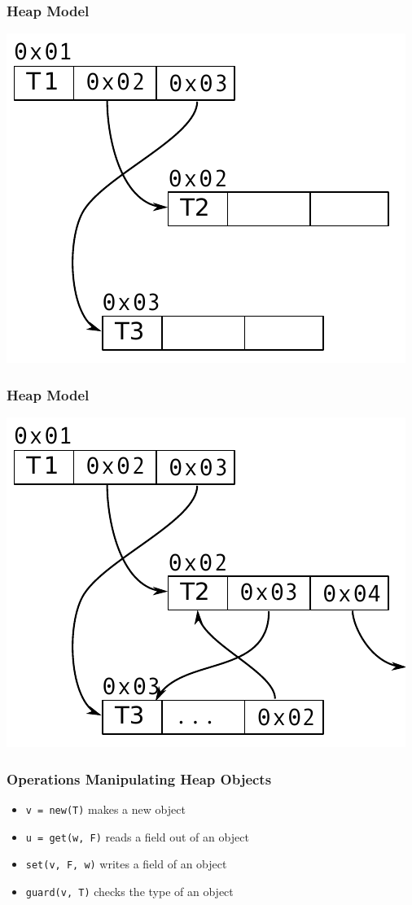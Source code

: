 \documentclass[utf8x]{beamer}
\begin{document}
\begin{frame}
  \frametitle{Heap Model}
  \includegraphics[scale=0.9]{figures/heap02}
\end{frame}

\begin{frame}
  \frametitle{Heap Model}
  \includegraphics[scale=0.9]{figures/heap03}
\end{frame}

\begin{frame}
  \frametitle{Operations Manipulating Heap Objects}
  \begin{itemize}
      \item \texttt{v = new(T)} makes a new object
      \item \texttt{u = get(w, F)} reads a field out of an object
      \item \texttt{set(v, F, w)} writes a field of an object
      \item \texttt{guard(v, T)} checks the type of an object
  \end{itemize}
\end{frame}
\end{document}
